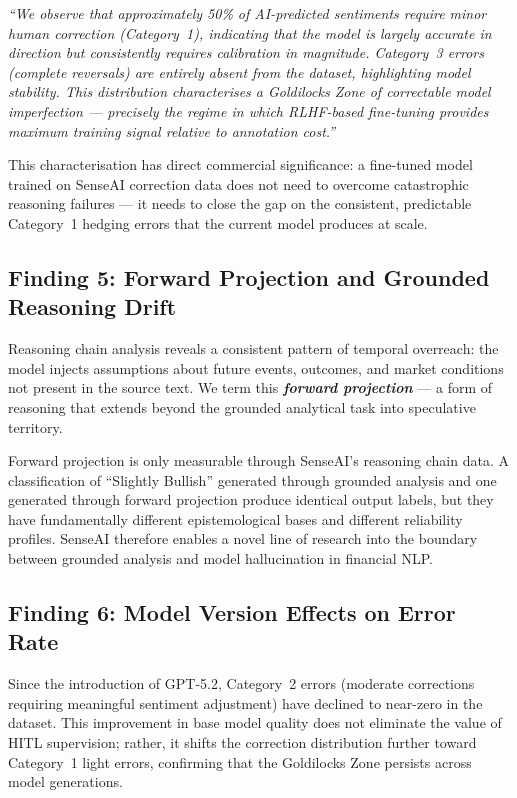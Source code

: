 \documentclass[11pt,a4paper]{article}
\begin{document}
\begin{mdframed}[style=quotestyle]
\textit{``We observe that approximately 50\% of AI-predicted sentiments require minor
human correction (Category~1), indicating that the model is largely accurate in
direction but consistently requires calibration in magnitude. Category~3 errors
(complete reversals) are entirely absent from the dataset, highlighting model
stability. This distribution characterises a Goldilocks Zone of correctable model
imperfection --- precisely the regime in which RLHF-based fine-tuning provides
maximum training signal relative to annotation cost.''}
\end{mdframed}

This characterisation has direct commercial significance: a fine-tuned model trained
on SenseAI correction data does not need to overcome catastrophic reasoning
failures --- it needs to close the gap on the consistent, predictable Category~1 hedging
errors that the current model produces at scale.

\subsection{Finding 5: Forward Projection and Grounded Reasoning Drift}

Reasoning chain analysis reveals a consistent pattern of temporal overreach: the
model injects assumptions about future events, outcomes, and market conditions not
present in the source text. We term this \textbf{\textit{forward projection}} --- a form of
reasoning that extends beyond the grounded analytical task into speculative territory.

Forward projection is only measurable through SenseAI's reasoning chain data. A
classification of ``Slightly Bullish'' generated through grounded analysis and one
generated through forward projection produce identical output labels, but they have
fundamentally different epistemological bases and different reliability profiles.
SenseAI therefore enables a novel line of research into the boundary between
grounded analysis and model hallucination in financial NLP.

\subsection{Finding 6: Model Version Effects on Error Rate}

Since the introduction of GPT-5.2, Category~2 errors (moderate corrections requiring
meaningful sentiment adjustment) have declined to near-zero in the dataset. This
improvement in base model quality does not eliminate the value of HITL supervision;
rather, it shifts the correction distribution further toward Category~1 light errors,
confirming that the Goldilocks Zone persists across model generations.
\end{document}
